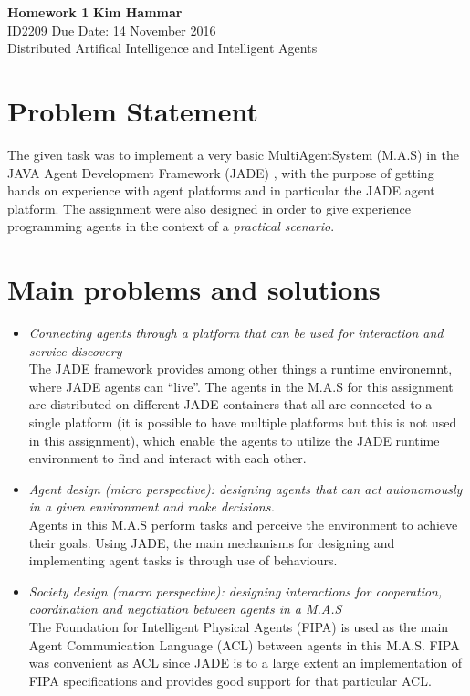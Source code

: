 \documentclass[a4paper, 11pt]{article}
\begin{document}
\noindent
\large\textbf{Homework 1} \hfill \textbf{Kim Hammar} \\
\normalsize ID2209 \hfill Due Date: 14 November 2016 \\
Distributed Artifical Intelligence and Intelligent Agents \hfill \\

\section*{Problem Statement}
The given task was to implement a very basic MultiAgentSystem (M.A.S) in the JAVA Agent Development Framework (JADE) \citep{jade}, with the purpose of getting hands on experience with agent platforms and in particular the JADE agent platform. The assignment were also designed in order  to give experience programming agents in the context of a \textit{practical scenario}.

\section*{Main problems and solutions}
\begin{itemize}
\item \textit{Connecting agents through a platform that can be used for interaction and service discovery}\\
The JADE framework provides among other things a runtime environemnt, where JADE agents can ``live''. The agents in the M.A.S for this assignment are distributed on different JADE containers that all are connected to a single platform (it is possible to have multiple platforms but this is not used in this assignment), which enable the agents to utilize the JADE runtime environment to find and interact with each other.

\item \textit{Agent design (micro perspective): designing agents that can act autonomously in a given environment and make decisions.}\\
Agents in this M.A.S perform tasks and perceive the environment to achieve their goals. Using JADE, the main mechanisms for designing and implementing agent tasks is through use of behaviours.
\item \textit{Society design (macro perspective): designing interactions for cooperation, coordination and negotiation between agents in a M.A.S}\\
The Foundation for Intelligent Physical Agents (FIPA) is used as the main Agent Communication Language (ACL) between agents in this M.A.S. FIPA was convenient as ACL since JADE is to a large extent an implementation of FIPA specifications and provides good support for that particular ACL.
\end{itemize}
\end{document}
